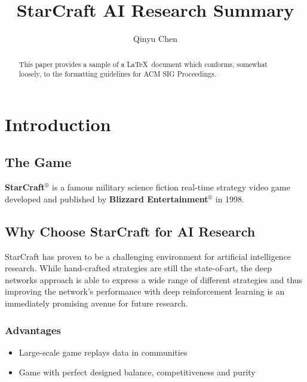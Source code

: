 \documentclass[sigconf]{acmart}
\begin{document}
\title{StarCraft AI Research Summary}

\author{Qinyu Chen}

\begin{abstract}
This paper provides a sample of a \LaTeX\ document which conforms, somewhat loosely, to the formatting guidelines for
ACM SIG Proceedings.
\end{abstract}


\maketitle


\section{Introduction}
\subsection{The Game}
\textbf{StarCraft$^\circledR$} is a famous military science fiction real-time strategy video game developed and published by \textbf{Blizzard Entertainment$^\circledR$} in 1998.
\subsection{Why Choose StarCraft for AI Research}
StarCraft has proven to be a challenging environment for artificial intelligence research. While hand-crafted strategies are still the state-of-art, the deep networks approach is able to express a wide range of different strategies and thus improving the network’s performance with deep reinforcement learning is an immediately promising avenue for future research.\cite{DBLP:journals/corr/JustesenR17}
\subsubsection{Advantages}
\begin{itemize}
\item Large-scale game replays data in communities
\item Game with perfect designed balance, competitiveness and purity
\end{itemize}
\end{document}
